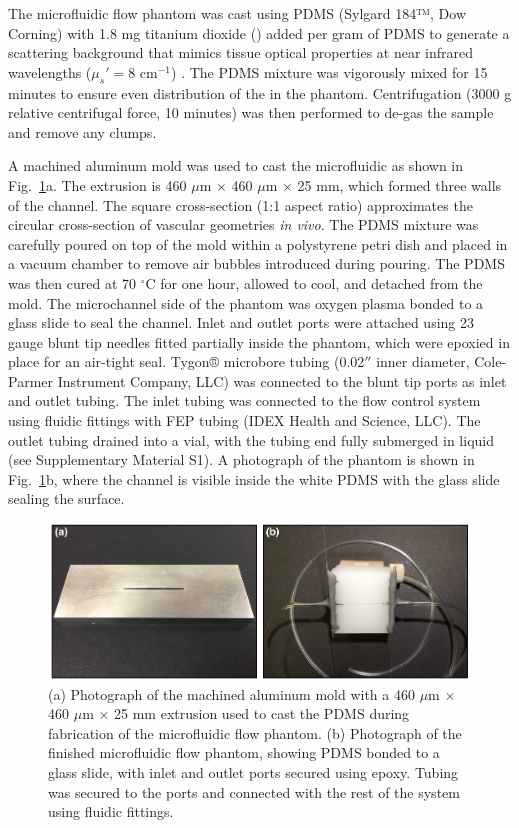 \documentclass[12pt]{spieman}
\begin{document}
\begin{spacing}{2}
The microfluidic flow phantom was cast using PDMS (Sylgard 184™, Dow Corning) with 1.8 mg titanium dioxide () added per gram of PDMS to generate a scattering background that mimics tissue optical properties at near infrared wavelengths ($\mu_s' = 8$ cm$^{-1}$) \cite{Parthasarathy:2008el,Yaroslavsky:2002tg}. The PDMS  mixture was vigorously mixed for 15 minutes to ensure even distribution of the  in the phantom. Centrifugation (3000 g relative centrifugal force, 10 minutes) was then performed to de-gas the sample and remove any  clumps.

A machined aluminum mold was used to cast the microfluidic as shown in Fig.~\ref{fig:microfluidic}a. The extrusion is 460 $\mu$m $\times$ 460 $\mu$m $\times$ 25 mm, which formed three walls of the channel. The square cross-section (1:1 aspect ratio) approximates the circular cross-section of vascular geometries \textit{in vivo}. The PDMS  mixture was carefully poured on top of the mold within a polystyrene petri dish and placed in a vacuum chamber to remove air bubbles introduced during pouring. The PDMS was then cured at 70 $^\circ$C for one hour, allowed to cool, and detached from the mold. The microchannel side of the phantom was oxygen plasma bonded to a glass slide to seal the channel. Inlet and outlet ports were attached using 23 gauge blunt tip needles fitted partially inside the phantom, which were epoxied in place for an air-tight seal. Tygon® microbore tubing (0.02$''$ inner diameter, Cole-Parmer Instrument Company, LLC) was connected to the blunt tip ports as inlet and outlet tubing. The inlet tubing was connected to the flow control system using fluidic fittings with FEP tubing (IDEX Health and Science, LLC). The outlet tubing drained into a vial, with the tubing end fully submerged in liquid (see Supplementary Material S1). A photograph of the phantom is shown in Fig.~\ref{fig:microfluidic}b, where the channel is visible inside the white PDMS with the glass slide sealing the surface.

\begin{figure}
    \includegraphics[width=\textwidth]{Figure1.pdf}
    \caption {
        (a) Photograph of the machined aluminum mold with a 460 $\mu$m $\times$ 460 $\mu$m $\times$ 25 mm extrusion used to cast the PDMS during fabrication of the microfluidic flow phantom. (b) Photograph of the finished microfluidic flow phantom, showing PDMS bonded to a glass slide, with inlet and outlet ports secured using epoxy. Tubing was secured to the ports and connected with the rest of the system using fluidic fittings.
    }
    \label{fig:microfluidic}
\end{figure}


\end{spacing}
\end{document}
